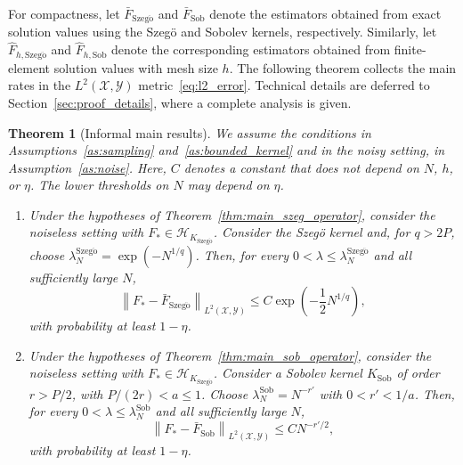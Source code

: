 \documentclass[11pt]{article}
\numberwithin{equation}{section}
\theoremstyle{plain}
\newtheorem{theorem}{Theorem}[section]
\theoremstyle{definition}
\theoremstyle{remark}
\newcommand{\X}{\mathcal{X}}
\newcommand{\Hs}{\mathcal{H}}
\newcommand{\Y}{\mathcal{Y}}
\newcommand{\norm}[1]{\left\lVert#1\right\rVert}
\begin{document}
For compactness, let $\bar{F}_{\mathrm{Szeg\ddot{o}}}$ and
$\bar{F}_{\mathrm{Sob}}$ denote the estimators obtained from exact solution
values using the Szegö and Sobolev kernels, respectively. Similarly, let
$\hat{F}_{h,\mathrm{Szeg\ddot{o}}}$ and $\hat{F}_{h,\mathrm{Sob}}$ denote the
corresponding estimators obtained from finite-element solution values with
mesh size $h$.  The following theorem collects the main rates in the
$L^2(\X,\Y)$ metric~\eqref{eq:l2_error}. Technical details are deferred to
Section~\ref{sec:proof_details}, where a complete analysis is given.

\begin{theorem}[Informal main results]
\label{thm:overview_rates}
We  assume the conditions in  Assumptions~\ref{as:sampling} and~\ref{as:bounded_kernel} and  in the noisy setting, in Assumption~\ref{as:noise}.
Here,  $C$ denotes a constant that does not depend on $N$, $h$, or $\eta$. The lower thresholds on $N$ may depend on $\eta$.

\begin{enumerate}[label=(\roman*)]

\item Under the  hypotheses of
Theorem~\ref{thm:main_szeg_operator}, consider the noiseless
setting with $F_*\in\Hs_{K_{\mathrm{Szeg\ddot{o}}}}$. Consider the Szegö kernel and,
for $q>2P$, choose
$\lambda_N^{\mathrm{Szeg\ddot{o}}}=\exp(-N^{1/q})$.
Then, for every
$0<\lambda\leq\lambda_N^{\mathrm{Szeg\ddot{o}}}$ and all sufficiently large $N$,
\begin{equation}
\norm{F_*-\bar{F}_{\mathrm{Szeg\ddot{o}}}}_{L^2(\X,\Y)}
\leq
C\exp\left(-\frac{1}{2}N^{1/q}\right),
\label{eq:overview_szeg_rate}
\end{equation}
with probability at least $1-\eta$.

\item Under the  hypotheses of
Theorem~\ref{thm:main_sob_operator}, consider the noiseless setting with
$F_*\in\Hs_{K_{\mathrm{Szeg\ddot{o}}}}$. Consider a Sobolev kernel
$K_{\mathrm{Sob}}$ of order $r>P/2$, with
$P/(2r)<a\leq1$. Choose
$\lambda_N^{\mathrm{Sob}}=N^{-r'}$ with $0<r'<1/a$.
Then, for every
$0<\lambda\leq\lambda_N^{\mathrm{Sob}}$ and all sufficiently large $N$,
\begin{equation}
\norm{F_*-\bar{F}_{\mathrm{Sob}}}_{L^2(\X,\Y)}
\leq
C N^{-r'/2},
\label{eq:overview_sob_rate}
\end{equation}
with probability at least $1-\eta$.


\end{enumerate}
\end{theorem}
\end{document}
